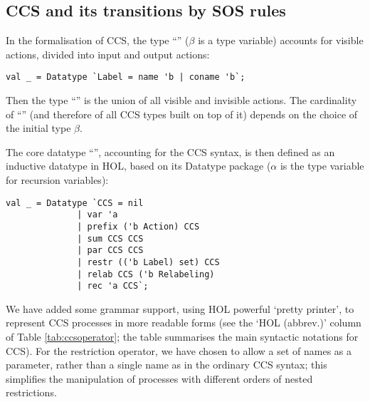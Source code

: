 
\subsection{CCS and its transitions by SOS rules}

In the formalisation of CCS, 
the type ``'' ($\beta$ is a
type variable) accounts for visible actions, divided into input
and output actions:
\begin{lstlisting}
val _ = Datatype `Label = name 'b | coname 'b`;
\end{lstlisting}
Then
the type ``'' is the
union of all visible and invisible actions. The cardinality of
``'' (and therefore of all
CCS types built on top of it) 
 depends on the choice of the initial type $\beta$.

The core datatype ``'', accounting for the CCS syntax, is then defined as an inductive
datatype in HOL, based on its Datatype package ($\alpha$ is the type
variable for recursion variables):
\begin{lstlisting}
val _ = Datatype `CCS = nil
		      | var 'a
		      | prefix ('b Action) CCS
		      | sum CCS CCS
		      | par CCS CCS
		      | restr (('b Label) set) CCS
		      | relab CCS ('b Relabeling)
		      | rec 'a CCS`;
\end{lstlisting}

We have added some  grammar support,
 using HOL powerful `pretty printer', to represent CCS
processes in more readable forms (see the `HOL (abbrev.)'
column of Table \ref{tab:ccsoperator}; the table summarises 
the main syntactic notations for CCS). For the restriction
operator, we have chosen to allow a  set of names as a parameter, rather than a
  single name as in the ordinary  CCS syntax; this simplifies 
the manipulation of 
 processes with different orders of
  nested restrictions.

